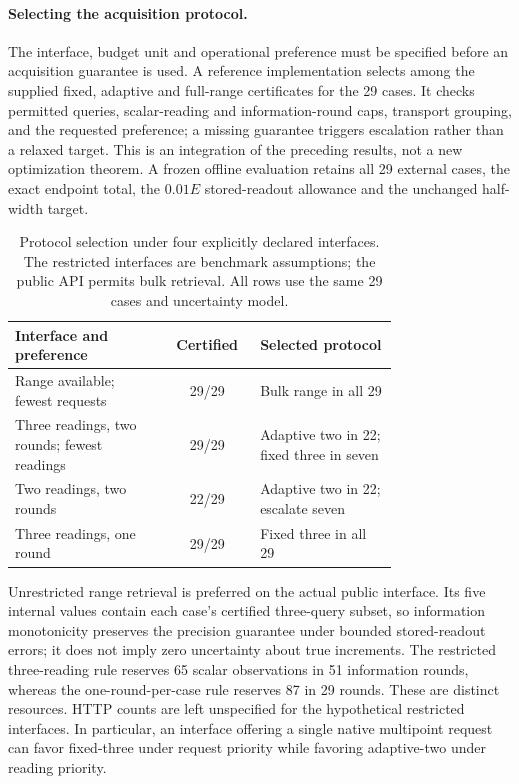 \paragraph{Selecting the acquisition protocol.}
The interface, budget unit and operational preference must be specified before
an acquisition guarantee is used. A reference implementation selects among
the supplied fixed, adaptive and full-range certificates for the 29 cases.
It checks permitted
queries, scalar-reading and information-round caps, transport grouping, and
the requested preference; a missing guarantee triggers escalation rather than
a relaxed target. This is an integration of the preceding results, not a new
optimization theorem. A frozen offline evaluation retains all 29 external
cases, the exact endpoint total, the $0.01E$ stored-readout allowance and the
unchanged half-width target.

\begin{table}[t]
\centering\small
\caption{Protocol selection under four explicitly declared interfaces. The
restricted interfaces are benchmark assumptions; the public API permits bulk
retrieval. All rows use the same 29 cases and uncertainty model.}
\label{tab:protocol-selection}
\begin{tabular}{p{0.40\linewidth}cp{0.36\linewidth}}
\hline
Interface and preference & Certified & Selected protocol \\
\hline
Range available; fewest requests & 29/29 & Bulk range in all 29 \\
Three readings, two rounds; fewest readings & 29/29 & Adaptive two in 22; fixed three in seven \\
Two readings, two rounds & 22/29 & Adaptive two in 22; escalate seven \\
Three readings, one round & 29/29 & Fixed three in all 29 \\
\hline
\end{tabular}
\end{table}

Unrestricted range retrieval is preferred on the actual public interface.
Its five internal values contain each case's certified three-query subset,
so information monotonicity preserves the precision guarantee under bounded
stored-readout errors; it does not imply zero uncertainty about true increments.
The restricted three-reading rule reserves 65 scalar observations in 51
information rounds, whereas the one-round-per-case rule reserves 87 in 29
rounds. These are distinct resources. HTTP counts are left unspecified for
the hypothetical restricted interfaces. In particular, an interface offering
a single native multipoint request can favor fixed-three under request
priority while favoring adaptive-two under reading priority.

